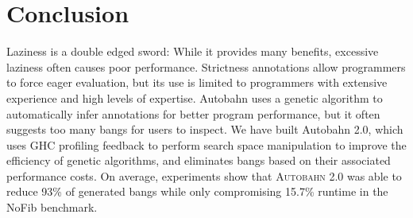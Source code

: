 \documentclass[format=sigplan, review=true]{acmart}
\newcommand{\At}[0]{\textsc{Autobahn 2.0}}
\begin{document}
\section{Conclusion}

Laziness is a double edged sword: While it provides many benefits,
excessive laziness often causes poor performance. Strictness
annotations allow programmers to force eager evaluation, but its use
is limited to programmers with extensive experience and high levels of
expertise. Autobahn uses a genetic algorithm to automatically infer
annotations for better program performance, but it often suggests too
many bangs for users to inspect. We have built Autobahn 2.0, which
uses GHC profiling feedback to perform search space manipulation to
improve the efficiency of genetic algorithms, and eliminates bangs
based on their associated performance costs. On average, experiments
show that \At{} was able to reduce 93\% of generated bangs while
only compromising 15.7\% runtime in the NoFib benchmark.



\end{document}
